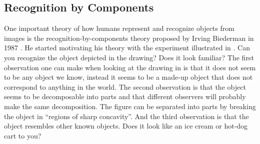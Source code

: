 \subsection{Recognition by Components}




One important theory of how humans represent and recognize objects from images is the recognition-by-components theory proposed by Irving Biederman in 1987 \cite{Biederman1987}. 
He started motivating his theory with the experiment illustrated in \fig{\ref{fig:do_it_yourself}}. Can you recognize the object depicted in the drawing? Does it look familiar?
The first observation one can make when looking at the drawing in \fig{\ref{fig:do_it_yourself}} is that it does not seem to be any object we know, instead it seems to be a made-up object that does not correspond to anything in the world. The second observation is that the object seems to be decomposable into parts and that different observers will probably make the same decomposition. The figure can be separated into parts by breaking the object in ``regions of sharp concavity''. And the third observation is that the object resembles other known objects. Does it look like an ice cream or hot-dog cart to you? 

